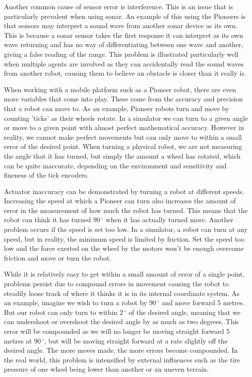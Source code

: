 \documentclass{article}
\begin{document}
Another common cause of sensor error is interference. This is an issue that is particularly prevalent when 
using sonar. An example of this using the Pioneers is that sensors may interpret a sound wave from another 
sonar device as its own. This is because a sonar sensor takes the first response it can interpret as its own wave 
returning and has no way of differentiating between one wave and another, giving a false reading of the range. 
This problem is illustrated particularly well when multiple agents are involved as they can accidentally read the sound
waves from another robot, causing them to believe an obstacle is closer than it really is. 

When working with a mobile platform such as a Pioneer robot, there are even more variables that come into play. 
These come from the accuracy and precision that a robot can move to. As an example, Pioneer robots turn and move 
by counting 'ticks' as their wheels rotate. In a simulator we can turn to a given angle or move to a given point with 
almost perfect mathematical accuracy. However in reality, we cannot make perfect movements but can only move to within 
a small error of the desired point. When turning a physical robot, we are not measuring the angle that it has turned, 
but simply the amount a wheel has rotated, which can be quite inaccurate, depending on the environment and sensitivity
and fineness of the tick encoders.

Actuator inaccuracy can be demonstrated by turning a robot at different speeds. Increasing the speed at which a 
Pioneer can turn also increases the amount of error in the measurement of how much the robot has turned. 
This means that the robot can think it has turned $90\,^{\circ}$ when it has actually turned more. 
Another problem occurs if the speed is set too low. In a simulator, a robot can turn at any speed, but in reality, 
the minimum speed is limited by friction. Set the speed too low and the force exerted on the wheel by the motors 
won't be enough overcome friction and move or turn the robot.

While it is relatively easy to get within a small amount of error of a single point, problems persist due to 
compound errors in movement causing the robot to steadily loose track of where it thinks it is in its internal 
coordinate system. As an example, imagine we wish to turn a robot by $90\,^{\circ}$ and move forward 5 metres. But 
our robot can only turn to within $2\,^{\circ}$ of the desired angle, meaning that we can undershoot or overshoot 
the desired angle by as much as two degrees. This error will be compounded as we will no longer be moving straight 
forward 5 metres at $90\,^{\circ}$, but will be moving straight forward at a rate slightly off the desired angle. The
more moves made, the more errors become compounded. In the real world, this problem is intensified by external 
influences such as the tire pressure of one wheel being lower than another or an uneven terrain.
\end{document}
